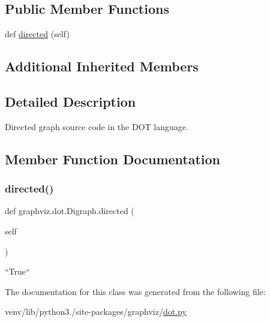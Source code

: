 \subsection*{Public Member Functions}
\begin{DoxyCompactItemize}
\item 
def \hyperlink{classgraphviz_1_1dot_1_1Digraph_aa3f68611d89b38bc4f5aa45ca396998f}{directed} (self)
\end{DoxyCompactItemize}
\subsection*{Additional Inherited Members}


\subsection{Detailed Description}
\begin{DoxyVerb}Directed graph source code in the DOT language.\end{DoxyVerb}
 

\subsection{Member Function Documentation}
\mbox{\label{classgraphviz_1_1dot_1_1Digraph_aa3f68611d89b38bc4f5aa45ca396998f}} 
\subsubsection{\texorpdfstring{directed()}{directed()}}
{\footnotesize\ttfamily def graphviz.\+dot.\+Digraph.\+directed (\begin{DoxyParamCaption}\item[{}]{self }\end{DoxyParamCaption})}

\begin{DoxyVerb}``True``\end{DoxyVerb}
 

The documentation for this class was generated from the following file\+:\begin{DoxyCompactItemize}
\item 
venv/lib/python3./site-\/packages/graphviz/\hyperlink{dot_8py}{dot.\+py}\end{DoxyCompactItemize}
